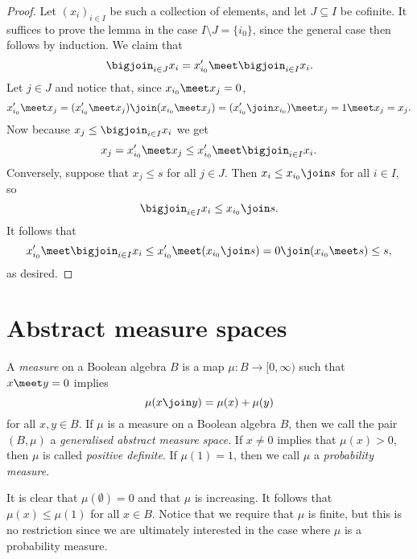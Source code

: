 \documentclass[article, a4paper, 11pt, oneside]{memoir}
\numberwithin{equation}{chapter}
\begin{document}
\begin{proof}
    Let $(x_i)_{i \in I}$ be such a collection of elements, and let $J \subseteq I$ be cofinite. It suffices to prove the lemma in the case $I \setminus J = \{i_0\}$, since the general case then follows by induction. We claim that
    \begin{equation*}
        \bigjoin_{i \in J} x_i
            = x_{i_0}' \meet \bigjoin_{i \in I} x_i.
    \end{equation*}
    Let $j \in J$ and notice that, since $x_{i_0} \meet x_j = 0$,
    \begin{equation*}
        x_{i_0}' \meet x_j
            = (x_{i_0}' \meet x_j) \join (x_{i_0} \meet x_j)
            = (x_{i_0}' \join x_{i_0}) \meet x_j
            = 1 \meet x_j
            = x_j.
    \end{equation*}
    Now because $x_j \leq \bigjoin_{i \in I} x_i$ we get
    \begin{equation*}
        x_j
            = x_{i_0}' \meet x_j
            \leq x_{i_0}' \meet \bigjoin_{i \in I} x_i.
    \end{equation*}
    Conversely, suppose that $x_j \leq s$ for all $j \in J$. Then $x_i \leq x_{i_0} \join s$ for all $i \in I$, so
    \begin{equation*}
        \bigjoin_{i \in I} x_i
            \leq x_{i_0} \join s.
    \end{equation*}
    It follows that
    \begin{equation*}
        x_{i_0}' \meet \bigjoin_{i \in I} x_i
            \leq x_{i_0}' \meet (x_{i_0} \join s)
            = 0 \join (x_{i_0} \meet s)
            \leq s,
    \end{equation*}
    as desired.
\end{proof}



\section{Abstract measure spaces}

\begin{definition}
    A \emph{measure} on a Boolean algebra $B$ is a map $\mu \colon B \to [0,\infty)$ such that $x \meet y = 0$ implies
    \begin{equation}
        \label{eq:finite-additivity}
        \mu(x \join y)
            = \mu(x) + \mu(y)
    \end{equation}
    for all $x,y \in B$. If $\mu$ is a measure on a Boolean algebra $B$, then we call the pair $(B,\mu)$ a \emph{generalised abstract measure space}. If $x \neq 0$ implies that $\mu(x) > 0$, then $\mu$ is called \emph{positive definite}. If $\mu(1) = 1$, then we call $\mu$ a \emph{probability measure}.
\end{definition}
%
It is clear that $\mu(\emptyset) = 0$ and that $\mu$ is increasing. It follows that $\mu(x) \leq \mu(1)$ for all $x \in B$. Notice that we require that $\mu$ is finite, but this is no restriction since we are ultimately interested in the case where $\mu$ is a probability measure.
\end{document}
